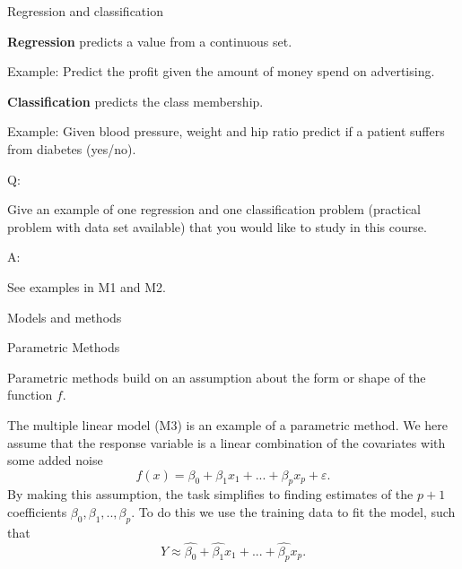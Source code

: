 \documentclass[ignorenonframetext,]{beamer}
\begin{document}
\begin{frame}

\begin{block}{Regression and classification}

\textbf{Regression} predicts a value from a continuous set.

Example: Predict the profit given the amount of money spend on
advertising.

\textbf{Classification} predicts the class membership.

Example: Given blood pressure, weight and hip ratio predict if a patient
suffers from diabetes (yes/no).

\begin{block}{Q:}

Give an example of one regression and one classification problem
(practical problem with data set available) that you would like to study
in this course.

\end{block}

\begin{block}{A:}

See examples in M1 and M2.

\end{block}

\end{block}

\end{frame}

\begin{frame}{Models and methods}

\begin{block}{Parametric Methods}

Parametric methods build on an assumption about the form or shape of the
function \(f\).

The multiple linear model (M3) is an example of a parametric method. We
here assume that the response variable is a linear combination of the
covariates with some added noise
\[f(x) = \beta_0 + \beta_1 x_1 + ... + \beta_p x_p+\varepsilon.\] By
making this assumption, the task simplifies to finding estimates of the
\(p+1\) coefficients \(\beta_0, \beta_1, .. ,\beta_p\). To do this we
use the training data to fit the model, such that
\[Y \approx \hat{\beta_0} + \hat{\beta_1} x_1 + ... + \hat{\beta_p} x_p.\]

\end{block}

\end{frame}
\end{document}
